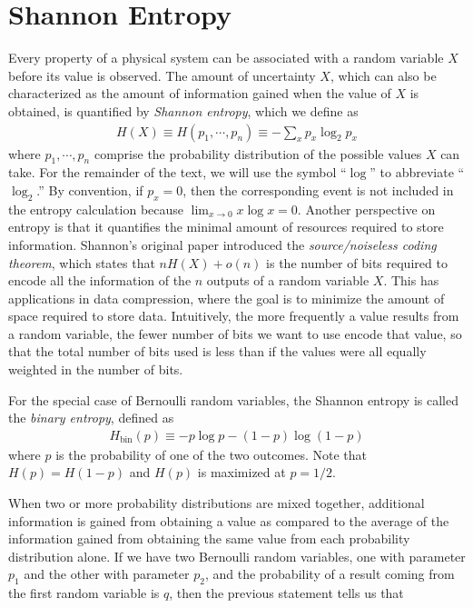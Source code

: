 \documentclass[a4paper, 12pt]{article}
\numberwithin{equation}{section}
\numberwithin{figure}{section}
\theoremstyle{definition}
\begin{document}
    \section{Shannon Entropy \label{sec:shannon}}
    Every property of a physical system can be associated with a random variable $X$ before its value is observed. The amount of uncertainty $X$, which can also be characterized as the amount of information gained when the value of $X$ is obtained, is quantified by \textit{Shannon entropy}, which we define as
    \begin{align}
        H(X) \equiv H(p_1, \cdots, p_n) \equiv -\sum_x p_x \log_2 p_x
    \end{align}
    where $p_1, \cdots, p_n$ comprise the probability distribution of the possible values $X$ can take. For the remainder of the text, we will use the symbol ``$\log$'' to abbreviate ``$\log_2$.'' By convention, if $p_x = 0$, then the corresponding event is not included in the entropy calculation because $\lim_{x \to 0} x \log x = 0$.
    Another perspective on entropy is that it quantifies the minimal amount of resources required to store information. Shannon's original paper introduced the \textit{source/noiseless coding theorem}, which states that $n H(X) + o(n)$ is the number of bits required to encode all the information of the $n$ outputs of a random variable $X$. This has applications in data compression, where the goal is to minimize the amount of space required to store data. Intuitively, the more frequently a value results from a random variable, the fewer number of bits we want to use encode that value, so that the total number of bits used is less than if the values were all equally weighted in the number of bits. \par
    For the special case of Bernoulli random variables, the Shannon entropy is called the \textit{binary entropy}, defined as
    \begin{align}
        H_{\text{bin}}(p) \equiv -p \log p - (1 - p) \log(1 - p)
    \end{align}
    where $p$ is the probability of one of the two outcomes. Note that $H(p) = H(1 - p)$ and $H(p)$ is maximized at $p = 1/2$. \par
    When two or more probability distributions are mixed together, additional information is gained from obtaining a value as compared to the average of the information gained from obtaining the same value from each probability distribution alone. If we have two Bernoulli random variables, one with parameter $p_1$ and the other with parameter $p_2$, and the probability of a result coming from the first random variable is $q$, then the previous statement tells us that
\end{document}
